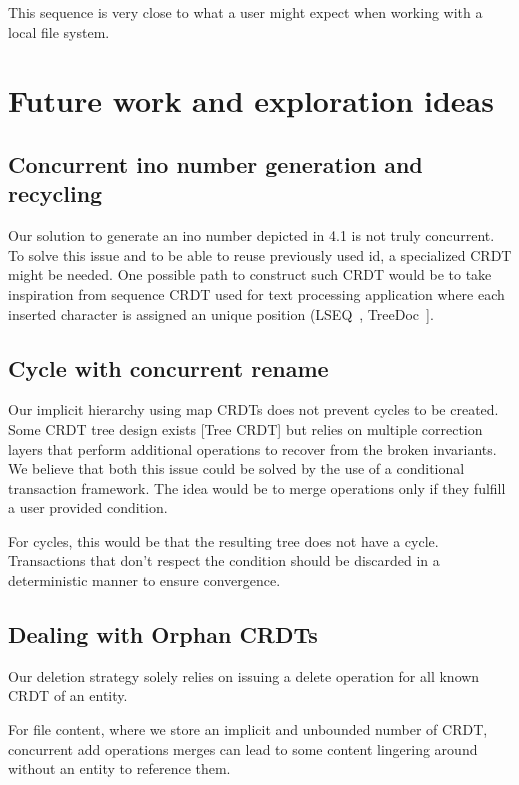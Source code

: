 \documentclass[sigconf,anonymous,10pt]{acmart}
\begin{document}
This sequence is very close to what a user might expect when working with
a local file system.

\section{Future work and exploration ideas}

\label{crdt:future}

\subsection{Concurrent ino number generation and recycling}

Our solution to generate an ino number depicted in 4.1 is not truly concurrent.
To solve this issue and to be able to reuse previously used id,
a specialized CRDT might be needed.
One possible path to construct such CRDT would be to take inspiration
from sequence CRDT used for text processing application where each inserted
character is assigned an unique position (LSEQ~\cite{nedelec2013lseq}, TreeDoc~\cite{letia2009crdts}].

\subsection{Cycle with concurrent rename}

Our implicit hierarchy using map CRDTs does not prevent cycles to be created.
Some CRDT tree design exists [Tree CRDT] but relies on multiple correction
layers that perform additional operations to recover from the broken invariants.
We believe that both this issue could be solved by the use of a conditional transaction framework.
The idea would be to merge operations only if they fulfill a user
provided condition.

For cycles, this would be that the resulting tree does not have a cycle.
Transactions that don't respect the condition should be discarded
in a deterministic manner to ensure convergence.

\subsection{Dealing with Orphan CRDTs}

Our deletion strategy solely relies on issuing a delete operation for all
known CRDT of an entity.

For file content, where we store an implicit and unbounded number of CRDT,
concurrent add operations merges can lead to some content lingering around
without an entity to reference them.
\end{document}
